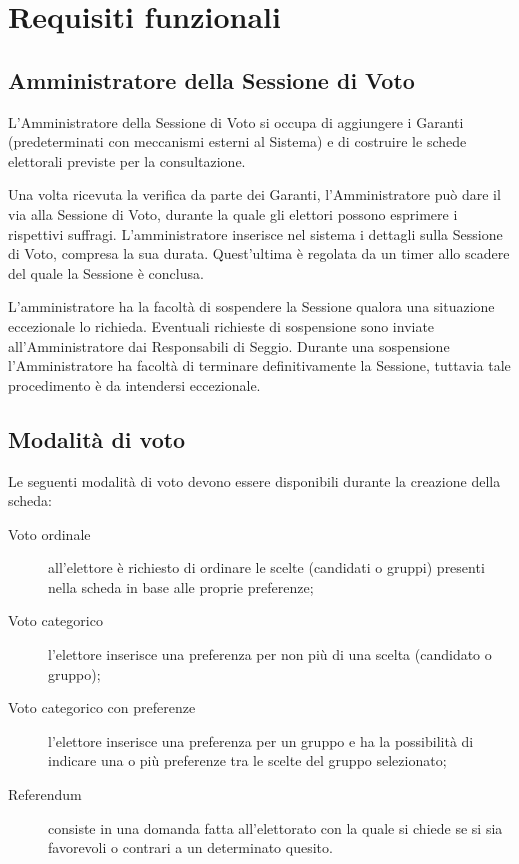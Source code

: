 \documentclass{report}
\begin{document}
\section{Requisiti funzionali}

\subsection{Amministratore della Sessione di Voto}
L'Amministratore della Sessione di Voto si occupa di aggiungere i Garanti (predeterminati con meccanismi esterni al Sistema) e di costruire le schede elettorali previste per la consultazione.

Una volta ricevuta la verifica da parte dei Garanti, l'Amministratore può dare il via alla Sessione di Voto, durante la quale gli elettori possono esprimere i rispettivi suffragi. L'amministratore inserisce nel sistema i dettagli sulla Sessione di Voto, compresa la sua durata. Quest'ultima è regolata da un timer allo scadere del quale la Sessione è conclusa.

L'amministratore ha la facoltà di sospendere la Sessione qualora una situazione eccezionale lo richieda. Eventuali richieste di sospensione sono inviate all'Amministratore dai Responsabili di Seggio. Durante una sospensione l'Amministratore ha facoltà di terminare definitivamente la Sessione, tuttavia tale procedimento è da intendersi eccezionale.


\subsection{Modalità di voto}
Le seguenti modalità di voto devono essere disponibili durante la creazione della scheda:
\begin{description}
	\item[Voto ordinale] all'elettore è richiesto di ordinare le scelte (candidati o gruppi) presenti nella scheda in base alle proprie preferenze;
	\item[Voto categorico] l'elettore inserisce una preferenza per non più di una scelta (candidato o gruppo);
	\item[Voto categorico con preferenze] l'elettore inserisce una preferenza per un gruppo e ha la possibilità di indicare una o più preferenze tra le scelte del gruppo selezionato;
	\item[Referendum] consiste in una domanda fatta all'elettorato con la quale si chiede se si sia favorevoli o contrari a un determinato quesito.
\end{description}
\end{document}
